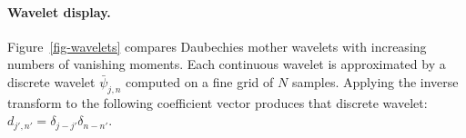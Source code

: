   
\paragraph{Wavelet display.}

Figure~\ref{fig-wavelets} compares Daubechies mother wavelets with increasing numbers of vanishing moments. Each continuous wavelet is approximated by a discrete wavelet $\bar \psi_{j,n}$ computed on a fine grid of $N$ samples. Applying the inverse transform to the following coefficient vector produces that discrete wavelet:
$d_{j',n'} = \delta_{j-j'} \delta_{n-n'}$.

